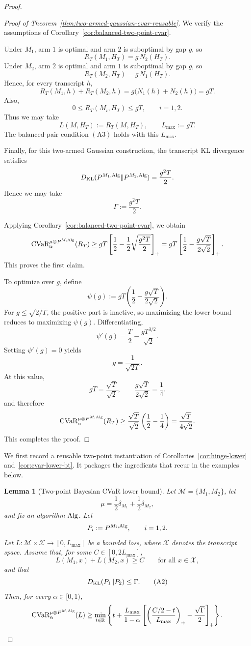\documentclass[conference]{IEEEtran}
\newtheorem{lemma}{Lemma}
\begin{document}
\begin{proof}[Proof]
\begin{proof}[Proof of Theorem~\ref{thm:two-armed-gaussian-cvar-reusable}]
We verify the assumptions of Corollary~\ref{cor:balanced-two-point-cvar}.

Under \(M_1\), arm \(1\) is optimal and arm \(2\) is suboptimal by gap \(g\), so
\[
R_T(M_1,H_T)=g\,N_2(H_T).
\]
Under \(M_2\), arm \(2\) is optimal and arm \(1\) is suboptimal by gap \(g\), so
\[
R_T(M_2,H_T)=g\,N_1(H_T).
\]
Hence, for every transcript \(h\),
\[
R_T(M_1,h)+R_T(M_2,h)
=
g\bigl(N_1(h)+N_2(h)\bigr)
=
gT.
\]
Also,
\[
0\le R_T(M_i,H_T)\le gT,
\qquad i=1,2.
\]
Thus we may take
\[
L(M,H_T):=R_T(M,H_T),
\qquad
L_{\max}:=gT.
\]
The balanced-pair condition \((\mathrm{A3})\) holds with this \(L_{\max}\).

Finally, for this two-armed Gaussian construction, the transcript KL divergence satisfies
\[
D_{\textup{KL}}(P^{M_1,\textup{Alg}}\|P^{M_2,\textup{Alg}})
=
\frac{g^2T}{2}.
\]
Hence we may take
\[
\Gamma:=\frac{g^2T}{2}.
\]

Applying Corollary~\ref{cor:balanced-two-point-cvar}, we obtain
\[
\textup{CVaR}_\alpha^{\mu\otimes P^{M,\textup{Alg}}}(R_T)
\ge
gT\left[\frac12-\frac{1}{2}\sqrt{\frac{g^2T}{2}}\right]_+
=
gT\left[\frac12-\frac{g\sqrt{T}}{2\sqrt{2}}\right]_+.
\]
This proves the first claim.

To optimize over \(g\), define
\[
\psi(g):=
gT\left(\frac12-\frac{g\sqrt{T}}{2\sqrt{2}}\right).
\]
For \(g\le \sqrt{2/T}\), the positive part is inactive, so maximizing the lower bound reduces to maximizing \(\psi(g)\). Differentiating,
\[
\psi'(g)=\frac{T}{2}-\frac{gT^{3/2}}{\sqrt{2}}.
\]
Setting \(\psi'(g)=0\) yields
\[
g=\frac{1}{\sqrt{2T}}.
\]
At this value,
\[
gT=\frac{\sqrt{T}}{\sqrt{2}},
\qquad
\frac{g\sqrt{T}}{2\sqrt{2}}=\frac14.
\]
and therefore
\[
\textup{CVaR}_\alpha^{\mu\otimes P^{M,\textup{Alg}}}(R_T)
\ge
\frac{\sqrt{T}}{\sqrt{2}}\left(\frac12-\frac14\right)
=
\frac{\sqrt{T}}{4\sqrt{2}}.
\]
This completes the proof.
\end{proof}
\fi

\iffalse
We first record a reusable two-point instantiation of Corollaries~\ref{cor:hinge-lower} and~\ref{cor:cvar-lower-bt}. It packages the ingredients that recur in the examples below.

\begin{lemma}[Two-point Bayesian \textup{CVaR} lower bound]
\label{lem:two-point-cvar}
Let \(\mathcal{M}=\{M_1,M_2\}\), let
\[
\mu=\frac12\delta_{M_1}+\frac12\delta_{M_2},
\]
and fix an algorithm \(\textup{Alg}\). Let
\[
P_i:=P^{M_i,\textup{Alg}},\qquad i=1,2.
\]
Let \(L:\mathcal{M}\times \mathcal{X}\to [0,L_{\max}]\) be a bounded loss, where \(\mathcal{X}\) denotes the transcript space. Assume that, for some \(C\in[0,2L_{\max}]\),
\[
L(M_1,x)+L(M_2,x)\ge C
\qquad
\text{for all }x\in\mathcal{X},
\tag{A1}
\]
and that
\[
D_{\textup{KL}}(P_1\|P_2)\le \Gamma.
\tag{A2}
\]
Then, for every \(\alpha\in[0,1)\),
\[
\textup{CVaR}_\alpha^{\mu\otimes P^{M,\textup{Alg}}}(L)
\ge
\min_{t\in\mathbb{R}}
\left\{
t+\frac{L_{\max}}{1-\alpha}
\left[
\left(\frac{C/2-t}{L_{\max}}\right)_+
-\frac{\sqrt{\Gamma}}{2}
\right]_+
\right\}.
\]
\end{lemma}


\end{proof}
\end{document}
